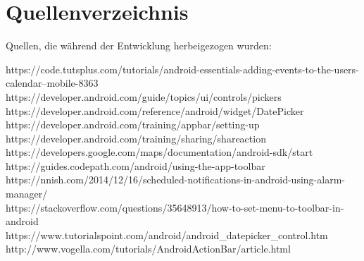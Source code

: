 \section{Quellenverzeichnis}


Quellen, die während der Entwicklung herbeigezogen wurden:

https://code.tutsplus.com/tutorials/android-essentials-adding-events-to-the-users-calendar--mobile-8363\\
https://developer.android.com/guide/topics/ui/controls/pickers\\
https://developer.android.com/reference/android/widget/DatePicker\\
https://developer.android.com/training/appbar/setting-up\\
https://developer.android.com/training/sharing/shareaction\\
https://developers.google.com/maps/documentation/android-sdk/start\\
https://guides.codepath.com/android/using-the-app-toolbar\\
https://nnish.com/2014/12/16/scheduled-notifications-in-android-using-alarm-manager/\\
https://stackoverflow.com/questions/35648913/how-to-set-menu-to-toolbar-in-android\\
https://www.tutorialspoint.com/android/android\_datepicker\_control.htm\\
http://www.vogella.com/tutorials/AndroidActionBar/article.html\\


